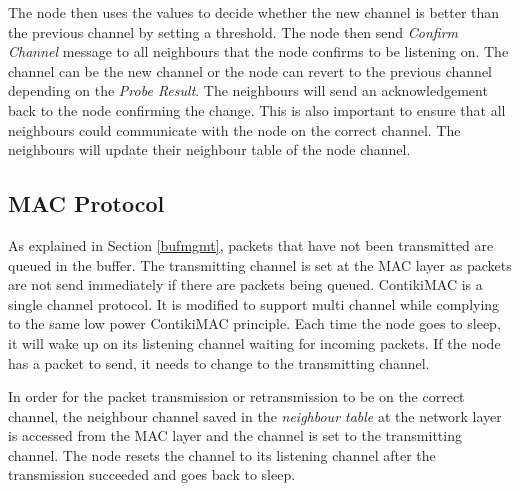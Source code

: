 The node then uses the values to decide whether the new channel is better than the previous channel by setting a threshold. The node then send \textit{Confirm Channel} message to all neighbours that the node confirms to be listening on. The channel can be the new channel or the node can revert to the previous channel depending on the \textit{Probe Result}. The neighbours will send an acknowledgement back to the node confirming the change. This is also important to ensure that all neighbours could communicate with the node on the correct channel. The neighbours will update their neighbour table of the node channel. 

\subsection{MAC Protocol}
As explained in Section \ref{bufmgmt}, packets that have not been transmitted are queued in the buffer. The transmitting channel is set at the MAC layer as packets are not send immediately if there are packets being queued. ContikiMAC is a single channel protocol. It is modified to support multi channel while complying to the same low power ContikiMAC principle. Each time the node goes to sleep, it will wake up on its listening channel waiting for incoming packets. If the node has a packet to send, it needs to change to the transmitting channel.

In order for the packet transmission or retransmission to be on the correct channel, the neighbour channel saved in the \textit{neighbour table} at the network layer is accessed from the MAC layer and the channel is set to the transmitting channel. The node resets the channel to its listening channel after the transmission succeeded and goes back to sleep.

